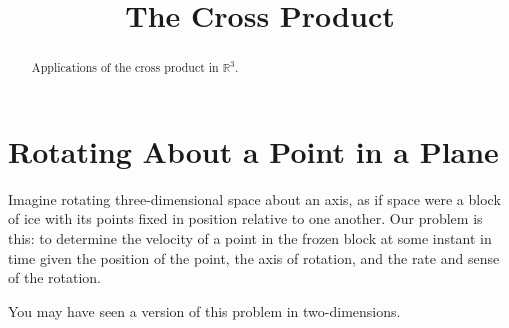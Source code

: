\documentclass{ximera}
\title{The Cross Product}
\begin{document}
\begin{abstract}
Applications of the cross product in $\mathbb{R}^3$.
\end{abstract}
\maketitle

\section{Rotating About a Point in a Plane}

Imagine rotating three-dimensional space about an axis, as if space were a block of ice with its points fixed in position relative to one another. Our problem is this: to determine the velocity of a point in the frozen block at some instant in time given the position of the point, the axis of rotation, and the rate and sense of the rotation.

 
\begin{onlineOnly}
    \begin{center}
\end{center}
\end{onlineOnly}





You may have seen a version of this problem in two-dimensions.
\end{document}
